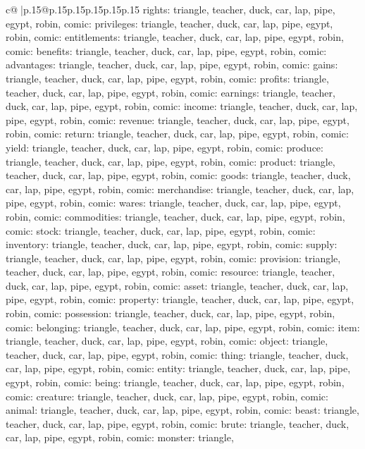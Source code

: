 \documentclass{article}
\begin{document}
{\begin{supertabular}{c@{$\;$}|p{.15\linewidth}@{}p{.15\linewidth}p{.15\linewidth}p{.15\linewidth}p{.15\linewidth}p{.15\linewidth}}
{{{rights\nTARGETS: triangle, teacher, duck, car, lap, pipe, egypt, robin, comic\n\nCLUE: privileges\nTARGETS: triangle, teacher, duck, car, lap, pipe, egypt, robin, comic\n\nCLUE: entitlements\nTARGETS: triangle, teacher, duck, car, lap, pipe, egypt, robin, comic\n\nCLUE: benefits\nTARGETS: triangle, teacher, duck, car, lap, pipe, egypt, robin, comic\n\nCLUE: advantages\nTARGETS: triangle, teacher, duck, car, lap, pipe, egypt, robin, comic\n\nCLUE: gains\nTARGETS: triangle, teacher, duck, car, lap, pipe, egypt, robin, comic\n\nCLUE: profits\nTARGETS: triangle, teacher, duck, car, lap, pipe, egypt, robin, comic\n\nCLUE: earnings\nTARGETS: triangle, teacher, duck, car, lap, pipe, egypt, robin, comic\n\nCLUE: income\nTARGETS: triangle, teacher, duck, car, lap, pipe, egypt, robin, comic\n\nCLUE: revenue\nTARGETS: triangle, teacher, duck, car, lap, pipe, egypt, robin, comic\n\nCLUE: return\nTARGETS: triangle, teacher, duck, car, lap, pipe, egypt, robin, comic\n\nCLUE: yield\nTARGETS: triangle, teacher, duck, car, lap, pipe, egypt, robin, comic\n\nCLUE: produce\nTARGETS: triangle, teacher, duck, car, lap, pipe, egypt, robin, comic\n\nCLUE: product\nTARGETS: triangle, teacher, duck, car, lap, pipe, egypt, robin, comic\n\nCLUE: goods\nTARGETS: triangle, teacher, duck, car, lap, pipe, egypt, robin, comic\n\nCLUE: merchandise\nTARGETS: triangle, teacher, duck, car, lap, pipe, egypt, robin, comic\n\nCLUE: wares\nTARGETS: triangle, teacher, duck, car, lap, pipe, egypt, robin, comic\n\nCLUE: commodities\nTARGETS: triangle, teacher, duck, car, lap, pipe, egypt, robin, comic\n\nCLUE: stock\nTARGETS: triangle, teacher, duck, car, lap, pipe, egypt, robin, comic\n\nCLUE: inventory\nTARGETS: triangle, teacher, duck, car, lap, pipe, egypt, robin, comic\n\nCLUE: supply\nTARGETS: triangle, teacher, duck, car, lap, pipe, egypt, robin, comic\n\nCLUE: provision\nTARGETS: triangle, teacher, duck, car, lap, pipe, egypt, robin, comic\n\nCLUE: resource\nTARGETS: triangle, teacher, duck, car, lap, pipe, egypt, robin, comic\n\nCLUE: asset\nTARGETS: triangle, teacher, duck, car, lap, pipe, egypt, robin, comic\n\nCLUE: property\nTARGETS: triangle, teacher, duck, car, lap, pipe, egypt, robin, comic\n\nCLUE: possession\nTARGETS: triangle, teacher, duck, car, lap, pipe, egypt, robin, comic\n\nCLUE: belonging\nTARGETS: triangle, teacher, duck, car, lap, pipe, egypt, robin, comic\n\nCLUE: item\nTARGETS: triangle, teacher, duck, car, lap, pipe, egypt, robin, comic\n\nCLUE: object\nTARGETS: triangle, teacher, duck, car, lap, pipe, egypt, robin, comic\n\nCLUE: thing\nTARGETS: triangle, teacher, duck, car, lap, pipe, egypt, robin, comic\n\nCLUE: entity\nTARGETS: triangle, teacher, duck, car, lap, pipe, egypt, robin, comic\n\nCLUE: being\nTARGETS: triangle, teacher, duck, car, lap, pipe, egypt, robin, comic\n\nCLUE: creature\nTARGETS: triangle, teacher, duck, car, lap, pipe, egypt, robin, comic\n\nCLUE: animal\nTARGETS: triangle, teacher, duck, car, lap, pipe, egypt, robin, comic\n\nCLUE: beast\nTARGETS: triangle, teacher, duck, car, lap, pipe, egypt, robin, comic\n\nCLUE: brute\nTARGETS: triangle, teacher, duck, car, lap, pipe, egypt, robin, comic\n\nCLUE: monster\nTARGETS: triangle, }}}
\end{supertabular}}
\end{document}
